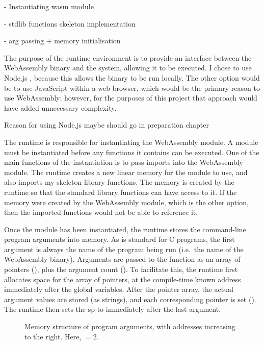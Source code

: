 \documentclass[00-main.tex]{subfiles}
\begin{document}
\begin{mrwComment}
- Instantiating wasm module

- stdlib functions skeleton implementation

- arg passing + memory initialisation
\end{mrwComment}

The purpose of the runtime environment is to provide an interface between the WebAssembly binary and the system, allowing it to be executed.
I chose to use Node.js , because this allows the binary to be run locally.
The other option would be to use JavaScript within a web browser, which would be the primary reason to use WebAssembly; however, for the purposes of this project that approach would have added unnecessary complexity.

\begin{mrwComment}
Reason for using Node.js maybe should go in preparation chapter
\end{mrwComment}

The runtime is responsible for instantiating the WebAssembly module.
A module must be instantiated before any functions it contains can be executed.
One of the main functions of the instantiation is to pass imports into the WebAssembly module.
The runtime creates a new linear memory for the module to use, and also imports my skeleton library functions.
The memory is created by the runtime so that the standard library functions can have access to it.
If the memory were created by the WebAssembly module, which is the other option, then the imported functions would not be able to reference it.

Once the module has been instantiated, the runtime stores the command-line program arguments into memory.
As is standard for C programs, the first argument is always the name of the program being run (i.e.\ the name of the WebAssembly binary).
Arguments are passed to the  function as an array of  pointers (), plus the argument count ().
To facilitate this, the runtime first allocates space for the array of pointers, at the compile-time known address immediately after the global variables.
After the pointer array, the actual argument values are stored (as strings), and each corresponding pointer is set ().
The runtime then sets the \gls{sp} to immediately after the last argument.

\begin{figure}[ht]
  \centering
  \caption{Memory structure of program arguments, with addresses increasing to the right. Here, ${} = 2$.}
  \label{fig:program args memory structure} %
\end{figure}
\end{document}
